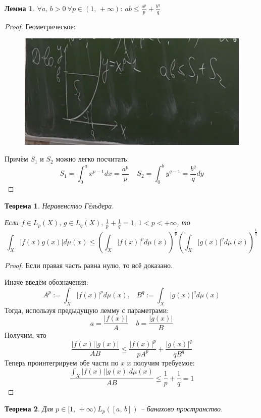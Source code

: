 \documentclass[a4paper,12pt]{article}
\renewcommand{\leq}{\ensuremath{\leqslant}}
\theoremstyle{plain}
\newtheorem{theorem}{Теорема}[section]
\newtheorem{lemma}{Лемма}[section]
\theoremstyle{definition}
\theoremstyle{remark}
\begin{document}
\begin{lemma}
	$\forall a,\,b > 0 \: \forall p \in (1,\,+\infty):\: ab \leq \frac{a^p}{p} + \frac{b^q}{q}$
\end{lemma}
\begin{proof}
	Геометрическое:

	\begin{figure}[h]
		\includegraphics[scale=0.5]{img/yung.png}
	\end{figure}

	Причём $S_1$ и $S_2$ можно легко посчитать:
	\[S_1 = \int_0^a x^{p - 1}dx = \frac{a^p}{p}\;\;\;\; S_2 = \int_0^b y^{q - 1} = \frac{b^q}{q}dy\]
\end{proof}

\begin{theorem}
	Неравенство Гёльдера.

	Если $f \in L_p(X),\, g \in L_q(X),\, \frac{1}{p} + \frac{1}{q} = 1,\, 1 < p < +\infty$, то
	\[\int_X |f(x)g(x)|d\mu(x) \leq \left(\int_X |f(x)|^pd\mu(x)\right)^{\frac{1}{p}}\left(\int_X |g(x)|^qd\mu(x)\right)^{\frac{1}{q}}\]
\end{theorem}

\begin{proof}
	Если правая часть равна нулю, то всё доказано.

	Иначе введём обозначения:
	\[A^p := \int_X|f(x)|^pd\mu(x),\;\;\; B^q := \int_X|g(x)|^qd\mu(x)\]
	Тогда, используя предыдущую лемму с параметрами:
	\[a = \frac{|f(x)|}{A}\;\;\;\; b = \frac{|g(x)|}{B}\]
	Получим, что
	\[\frac{|f(x)||g(x)|}{AB} \leq \frac{|f(x)|^p}{pA^p} + \frac{|g(x)|^q}{qB^q}\]
	Теперь проинтегрируем обе части по $x$ и получим требуемое:
	\[\frac{\int_X |f(x)||g(x)|d\mu(x)}{AB} \leq \frac{1}{p} + \frac{1}{q} = 1\]
\end{proof}

\begin{theorem}
	Для $p \in [1,\,+\infty) \: L_p([a,\,b])$ -- банахово пространство.
\end{theorem}
\end{document}

